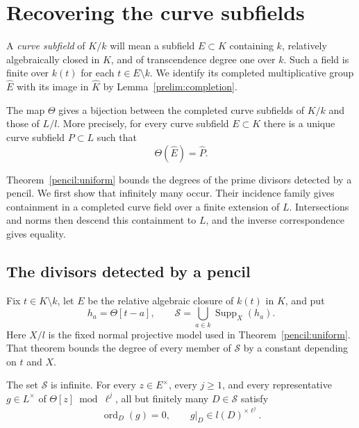 \section{Recovering the curve subfields}
\label{sec:curve-recovery}

A \emph{curve subfield} of $K/k$ will mean a subfield $E\subset K$
containing $k$, relatively algebraically closed in $K$, and of
transcendence degree one over $k$. Such a field is finite over $k(t)$
for each $t\in E\setminus k$. We identify its completed multiplicative
group $\widehat E$ with its image in $\widehat K$ by
Lemma~\ref{prelim:completion}.

\begin{theorem}\label{recovery:curves}
The map $\Theta$ gives a bijection between the completed curve
subfields of $K/k$ and those of $L/l$. More precisely, for every curve
subfield $E\subset K$ there is a unique curve subfield $P\subset L$
such that
\[
 \Theta(\widehat E)=\widehat P.
\]
\end{theorem}

Theorem~\ref{pencil:uniform} bounds the degrees of the prime divisors
detected by a pencil. We first show that infinitely many occur. Their
incidence family gives containment in a completed curve field over a
finite extension of $L$. Intersections and norms then descend this
containment to $L$, and the inverse correspondence gives equality.

\subsection{The divisors detected by a pencil}

Fix $t\in K\setminus k$, let $E$ be the relative algebraic closure of
$k(t)$ in $K$, and put
\[
 h_a=\Theta[t-a],\qquad
 \mathcal S=\bigcup_{a\in k}\operatorname{Supp}_X(h_a).
\]
Here $X/l$ is the fixed normal projective model used in
Theorem~\ref{pencil:uniform}. That theorem bounds the degree of every
member of $\mathcal S$ by a constant depending on $t$ and $X$.

\begin{lemma}\label{recovery:residue-powers}
The set $\mathcal S$ is infinite. For every $z\in E^\times$, every
$j\geq1$, and every representative $g\in L^\times$ of
$\Theta[z]\bmod\ell^j$, all but finitely many $D\in\mathcal S$ satisfy
\begin{equation}\label{eq:recovery-residue-powers}
 \operatorname{ord}_D(g)=0,
 \qquad g|_D\in l(D)^{\times\ell^j}.
\end{equation}
\end{lemma}

